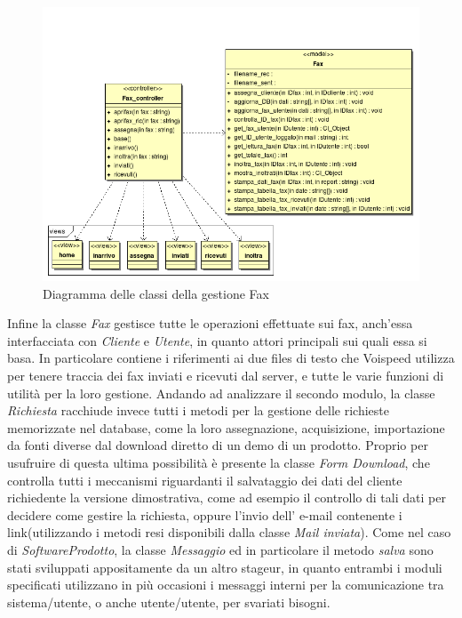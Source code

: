 \newpage
\begin{figure}[!ht]
\label{voip}
\centering
  \includegraphics[scale=0.8]{./images/FaxMVC.png}
\caption{Diagramma delle classi della gestione Fax}
\end{figure}


Infine la classe \textit{Fax} gestisce tutte le operazioni effettuate sui fax, anch'essa interfacciata con \textit{Cliente} e 
\textit{Utente}, in quanto attori principali sui quali essa si basa. In particolare contiene i riferimenti ai due files di 
testo che Voispeed utilizza per tenere traccia dei fax inviati e ricevuti dal server, e tutte le varie funzioni di utilit\`a 
per la loro gestione. 
Andando ad analizzare il secondo modulo, la classe \textit{Richiesta} racchiude invece tutti i metodi per la gestione
delle richieste memorizzate nel database, come la loro assegnazione, acquisizione, importazione da fonti diverse dal download diretto 
di un demo di un prodotto. Proprio per usufruire di questa ultima possibilit\`a \`e presente la classe \textit{Form Download}, 
che controlla tutti i meccanismi riguardanti il salvataggio dei dati del cliente richiedente la versione dimostrativa, come ad 
esempio il controllo di tali dati per decidere come gestire la richiesta, oppure l'invio dell' e-mail contenente i link(utilizzando i metodi 
resi disponibili dalla classe \textit{Mail inviata}).
Come nel caso di \textit{SoftwareProdotto}, la classe \textit{Messaggio} ed in particolare il metodo \textit{salva} sono stati 
sviluppati appositamente da un altro stageur, in quanto entrambi i moduli specificati utilizzano in pi\`u occasioni i messaggi 
interni per la comunicazione tra sistema/utente, o anche utente/utente, per svariati bisogni.

